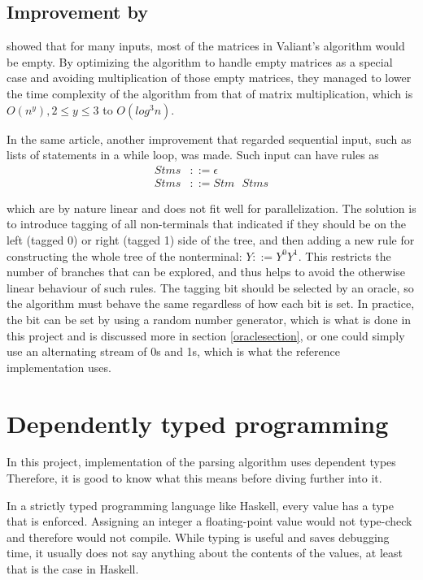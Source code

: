\documentclass[a4paper,12pt,twosided]{report}
\begin{document}
\subsection{Improvement by \citeauthor{parparsepaper}}
\citet{parparsepaper} showed that for many inputs, most of the matrices
in Valiant's algorithm would be empty. By optimizing the algorithm to handle
empty matrices as a special case and avoiding multiplication of those empty
matrices, they managed to lower the time complexity of the algorithm from that
of matrix multiplication, which is $O(n^y), 2 \leq y \leq 3$ to $O(log^3 n)$. 

In the same article, another improvement that regarded sequential input, such as
lists of statements in a while loop, was made. Such input can have rules as
\begin{align*}
Stms &::= \epsilon \\
Stms &::= Stm\text{ }Stms
\end{align*}

which are by nature linear and does not fit well for parallelization. The
solution is to introduce tagging of all non-terminals that indicated if they
should be on the left (tagged 0) or right (tagged 1) side of the tree, and then
adding a new rule for constructing the whole tree of the nonterminal: $Y ::=
Y^0Y^1$. This restricts the number of branches that can be explored, and thus
helps to avoid the otherwise linear behaviour of such rules. The tagging bit
should be selected by an oracle, so the algorithm must behave the same
regardless of how each bit is set. In practice, the bit can be set by using a
random number generator, which is what is done in this project and is discussed
more in section \ref{oraclesection}, or one could simply use an alternating
stream of 0s and 1s, which is what the reference implementation uses. 

\section{Dependently typed programming}
In this project, implementation of the parsing algorithm uses dependent types
Therefore, it is good to know what this means before diving further into it.

In a strictly typed programming language like Haskell, every value has a type
that is enforced. Assigning an integer a floating-point value would not
type-check and therefore would not compile. While typing is useful and saves
debugging time, it usually does not say anything about the contents of the
values, at least that is the case in Haskell.
\end{document}
